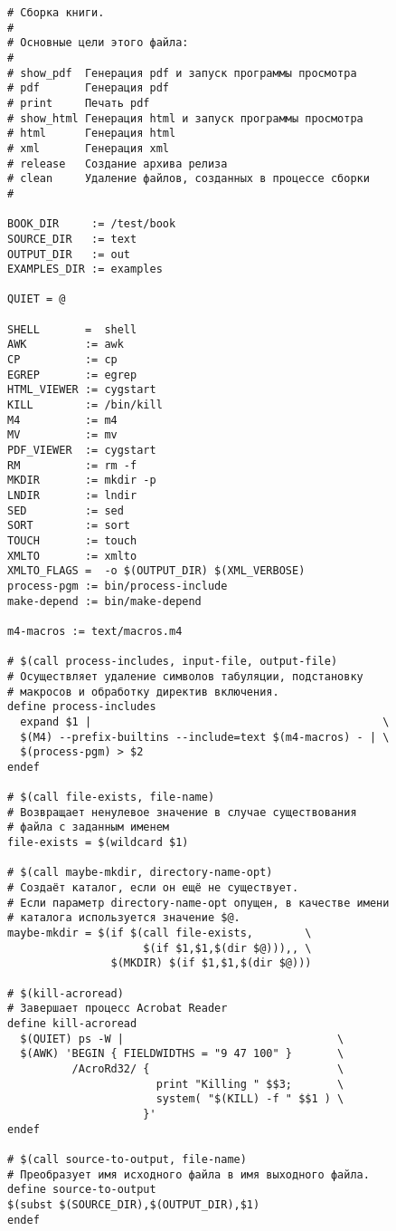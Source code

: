 \footnotesize{
\begin{verbatim}
# Сборка книги.
#
# Основные цели этого файла:
#
# show_pdf  Генерация pdf и запуск программы просмотра
# pdf       Генерация pdf
# print     Печать pdf
# show_html Генерация html и запуск программы просмотра
# html      Генерация html
# xml       Генерация xml
# release   Создание архива релиза
# clean     Удаление файлов, созданных в процессе сборки
#

BOOK_DIR     := /test/book
SOURCE_DIR   := text
OUTPUT_DIR   := out
EXAMPLES_DIR := examples

QUIET = @

SHELL       =  shell
AWK         := awk
CP          := cp
EGREP       := egrep
HTML_VIEWER := cygstart
KILL        := /bin/kill
M4          := m4
MV          := mv
PDF_VIEWER  := cygstart
RM          := rm -f
MKDIR       := mkdir -p
LNDIR       := lndir
SED         := sed
SORT        := sort
TOUCH       := touch
XMLTO       := xmlto
XMLTO_FLAGS =  -o $(OUTPUT_DIR) $(XML_VERBOSE)
process-pgm := bin/process-include
make-depend := bin/make-depend

m4-macros := text/macros.m4

# $(call process-includes, input-file, output-file)
# Осуществляет удаление символов табуляции, подстановку
# макросов и обработку директив включения.
define process-includes
  expand $1 |                                             \
  $(M4) --prefix-builtins --include=text $(m4-macros) - | \
  $(process-pgm) > $2
endef

# $(call file-exists, file-name)
# Возвращает ненулевое значение в случае существования
# файла с заданным именем
file-exists = $(wildcard $1)

# $(call maybe-mkdir, directory-name-opt)
# Создаёт каталог, если он ещё не существует.
# Если параметр directory-name-opt опущен, в качестве имени
# каталога используется значение $@.
maybe-mkdir = $(if $(call file-exists,        \
                     $(if $1,$1,$(dir $@))),, \
                $(MKDIR) $(if $1,$1,$(dir $@)))

# $(kill-acroread)
# Завершает процесс Acrobat Reader
define kill-acroread
  $(QUIET) ps -W |                                 \
  $(AWK) 'BEGIN { FIELDWIDTHS = "9 47 100" }       \
          /AcroRd32/ {                             \
                       print "Killing " $$3;       \
                       system( "$(KILL) -f " $$1 ) \
                     }'
endef

# $(call source-to-output, file-name)
# Преобразует имя исходного файла в имя выходного файла.
define source-to-output
$(subst $(SOURCE_DIR),$(OUTPUT_DIR),$1)
endef


\end{verbatim}}
